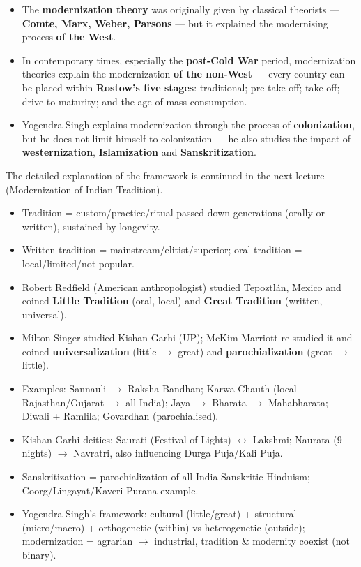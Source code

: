 \begin{DataFact}
\begin{itemize}
\item The \textbf{modernization theory} was originally given by classical theorists --- \textbf{Comte, Marx, Weber, Parsons} --- but it explained the modernising process \textbf{of the West}.
\item In contemporary times, especially the \textbf{post-Cold War} period, modernization theories explain the modernization \textbf{of the non-West} --- every country can be placed within \textbf{Rostow's five stages}: traditional; pre-take-off; take-off; drive to maturity; and the age of mass consumption.
\item Yogendra Singh explains modernization through the process of \textbf{colonization}, but he does not limit himself to colonization --- he also studies the impact of \textbf{westernization}, \textbf{Islamization} and \textbf{Sanskritization}.
\end{itemize}
\end{DataFact}

The detailed explanation of the framework is continued in the next lecture (Modernization of Indian Tradition).

\begin{QuickRevision}
\begin{itemize}
\item Tradition = custom/practice/ritual passed down generations (orally or written), sustained by longevity.
\item Written tradition = mainstream/elitist/superior; oral tradition = local/limited/not popular.
\item Robert Redfield (American anthropologist) studied Tepoztlán, Mexico and coined \textbf{Little Tradition} (oral, local) and \textbf{Great Tradition} (written, universal).
\item Milton Singer studied Kishan Garhi (UP); McKim Marriott re-studied it and coined \textbf{universalization} (little $\rightarrow$ great) and \textbf{parochialization} (great $\rightarrow$ little).
\item Examples: Sannauli $\rightarrow$ Raksha Bandhan; Karwa Chauth (local Rajasthan/Gujarat $\rightarrow$ all-India); Jaya $\rightarrow$ Bharata $\rightarrow$ Mahabharata; Diwali + Ramlila; Govardhan (parochialised).
\item Kishan Garhi deities: Saurati (Festival of Lights) $\leftrightarrow$ Lakshmi; Naurata (9 nights) $\rightarrow$ Navratri, also influencing Durga Puja/Kali Puja.
\item Sanskritization = parochialization of all-India Sanskritic Hinduism; Coorg/Lingayat/Kaveri Purana example.
\item Yogendra Singh's framework: cultural (little/great) + structural (micro/macro) + orthogenetic (within) vs heterogenetic (outside); modernization = agrarian $\rightarrow$ industrial, tradition \& modernity coexist (not binary).
\end{itemize}
\end{QuickRevision}

